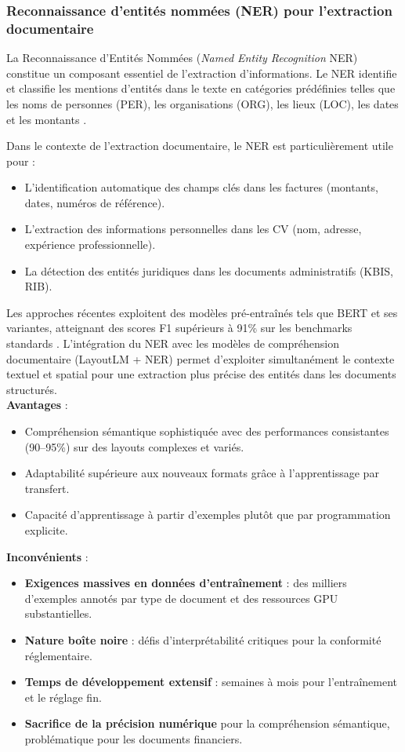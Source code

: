 \subsubsection{Reconnaissance d'entités nommées (NER) pour l'extraction documentaire}

La Reconnaissance d'Entités Nommées (\textit{Named Entity Recognition}  NER) constitue un composant essentiel de l'extraction d'informations. Le NER identifie et classifie les mentions d'entités dans le texte en catégories prédéfinies telles que les noms de personnes (PER), les organisations (ORG), les lieux (LOC), les dates et les montants \cite{li2022survey}.

Dans le contexte de l'extraction documentaire, le NER est particulièrement utile pour :
\begin{itemize}[label=, font=\large \color{darkgray}]
\item L'identification automatique des champs clés dans les factures (montants, dates, numéros de référence).
\item L'extraction des informations personnelles dans les CV (nom, adresse, expérience professionnelle).
\item La détection des entités juridiques dans les documents administratifs (KBIS, RIB).
\end{itemize}

Les approches récentes exploitent des modèles pré-entraînés tels que BERT \cite{devlin2019bert} et ses variantes, atteignant des scores F1 supérieurs à 91\% sur les benchmarks standards \cite{li2022survey}. L'intégration du NER avec les modèles de compréhension documentaire (LayoutLM + NER) permet d'exploiter simultanément le contexte textuel et spatial pour une extraction plus précise des entités dans les documents structurés.
\\
\textbf{Avantages} :
\begin{itemize}[label=, font=\large \color{darkgray}]
\item Compréhension sémantique sophistiquée avec des performances consistantes (90--95\%) sur des layouts complexes et variés.
\item Adaptabilité supérieure aux nouveaux formats grâce à l'apprentissage par transfert.
\item Capacité d'apprentissage à partir d'exemples plutôt que par programmation explicite.
\end{itemize}

\textbf{Inconvénients} :
\begin{itemize}[label=, font=\large \color{darkgray}]
\item \textbf{Exigences massives en données d'entraînement} : des milliers d'exemples annotés par type de document et des ressources GPU substantielles.
\item \textbf{Nature boîte noire} : défis d'interprétabilité critiques pour la conformité réglementaire.
\item \textbf{Temps de développement extensif} : semaines à mois pour l'entraînement et le réglage fin.
\item \textbf{Sacrifice de la précision numérique} pour la compréhension sémantique, problématique pour les documents financiers.
\end{itemize}



